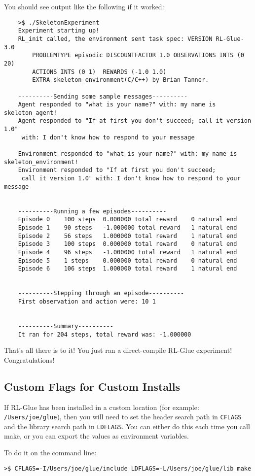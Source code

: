 \documentclass[11pt]{article}
\begin{document}
You should see output like the following if it worked:
\begin{verbatim}
	>$ ./SkeletonExperiment
	Experiment starting up!
	RL_init called, the environment sent task spec: VERSION RL-Glue-3.0 
		PROBLEMTYPE episodic DISCOUNTFACTOR 1.0 OBSERVATIONS INTS (0 20) 
		ACTIONS INTS (0 1)  REWARDS (-1.0 1.0)  
		EXTRA skeleton_environment(C/C++) by Brian Tanner.

	----------Sending some sample messages----------
	Agent responded to "what is your name?" with: my name is skeleton_agent!
	Agent responded to "If at first you don't succeed; call it version 1.0"
	 with: I don't know how to respond to your message

	Environment responded to "what is your name?" with: my name is skeleton_environment!
	Environment responded to "If at first you don't succeed;
	 call it version 1.0" with: I don't know how to respond to your message


	----------Running a few episodes----------
	Episode 0	 100 steps 	0.000000 total reward	 0 natural end 
	Episode 1	 90 steps 	-1.000000 total reward	 1 natural end 
	Episode 2	 56 steps 	1.000000 total reward	 1 natural end 
	Episode 3	 100 steps 	0.000000 total reward	 0 natural end 
	Episode 4	 96 steps 	-1.000000 total reward	 1 natural end 
	Episode 5	 1 steps 	0.000000 total reward	 0 natural end 
	Episode 6	 106 steps 	1.000000 total reward	 1 natural end 


	----------Stepping through an episode----------
	First observation and action were: 10 1


	----------Summary----------
	It ran for 204 steps, total reward was: -1.000000
\end{verbatim}

That's all there is to it! You just ran a direct-compile RL-Glue experiment! Congratulations!

\subsection{Custom Flags for Custom Installs}
\label{sec:custom-flags}
If RL-Glue has been installed in a custom location (for example: \texttt{/Users/joe/glue}), then you will
need to set the header search path in \texttt{CFLAGS} and the library search path in \texttt{LDFLAGS}.  You can either do this each time you call make, 
or you can export the values as environment variables.

To do it on the command line:
\begin{verbatim}
>$ CFLAGS=-I/Users/joe/glue/include LDFLAGS=-L/Users/joe/glue/lib make
\end{verbatim}
\end{document}
